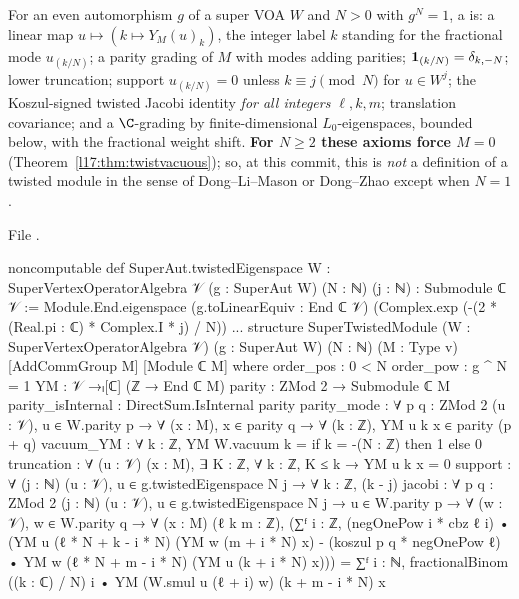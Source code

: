 \begin{definition}\label{l17:def:supertwisted}
For an even automorphism $g$ of a super VOA $W$ and $N>0$ with $g^N=1$, a 
is: a linear map $u\mapsto(k\mapsto Y_M(u)_k)$, the integer label $k$ standing for the fractional
mode $u_{(k/N)}$; a parity grading of $M$ with modes adding parities; $\mathbf{1}_{(k/N)}=\delta_{k,-N}$;
lower truncation; support $u_{(k/N)}=0$ unless $k\equiv j\pmod N$ for $u\in W^j$; the Koszul-signed
twisted Jacobi identity \emph{for all integers $\ell,k,m$}; translation covariance; and a
$\C$-grading by finite-dimensional $L_0$-eigenspaces, bounded below, with the fractional weight shift.
\textbf{For $N\ge2$ these axioms force $M=0$} (Theorem~\ref{l17:thm:twistvacuous}); so, at this
commit, this is \emph{not} a definition of a twisted module in the sense of Dong--Li--Mason or
Dong--Zhao except when $N=1$.
\end{definition}
\noindent File .
\begin{leancode}
noncomputable def SuperAut.twistedEigenspace {W : SuperVertexOperatorAlgebra 𝒱}
    (g : SuperAut W) (N : ℕ) (j : ℕ) : Submodule ℂ 𝒱 :=
  Module.End.eigenspace (g.toLinearEquiv : End ℂ 𝒱)
    (Complex.exp (-(2 * (Real.pi : ℂ) * Complex.I * j) / N))
...
structure SuperTwistedModule (W : SuperVertexOperatorAlgebra 𝒱) (g : SuperAut W)
    (N : ℕ) (M : Type v) [AddCommGroup M] [Module ℂ M] where
  order_pos : 0 < N
  order_pow : g ^ N = 1
  YM : 𝒱 →ₗ[ℂ] (ℤ → End ℂ M)
  parity : ZMod 2 → Submodule ℂ M
  parity_isInternal : DirectSum.IsInternal parity
  parity_mode : ∀ {p q : ZMod 2} (u : 𝒱), u ∈ W.parity p →
    ∀ (x : M), x ∈ parity q → ∀ (k : ℤ), YM u k x ∈ parity (p + q)
  vacuum_YM : ∀ k : ℤ, YM W.vacuum k = if k = -(N : ℤ) then 1 else 0
  truncation : ∀ (u : 𝒱) (x : M), ∃ K : ℤ, ∀ k : ℤ, K ≤ k → YM u k x = 0
  support : ∀ (j : ℕ) (u : 𝒱), u ∈ g.twistedEigenspace N j →
    ∀ k : ℤ, (k - j) %
  jacobi : ∀ {p q : ZMod 2} (j : ℕ) (u : 𝒱),
    u ∈ g.twistedEigenspace N j → u ∈ W.parity p →
    ∀ (w : 𝒱), w ∈ W.parity q → ∀ (x : M) (ℓ k m : ℤ),
    (∑ᶠ i : ℤ, (negOnePow i * cbz ℓ i) •
        (YM u (ℓ * N + k - i * N) (YM w (m + i * N) x)
          - (koszul p q * negOnePow ℓ) •
            YM w (ℓ * N + m - i * N) (YM u (k + i * N) x))) =
      ∑ᶠ i : ℕ, fractionalBinom ((k : ℂ) / N) i •
        YM (W.smul u (ℓ + i) w) (k + m - i * N) x
\end{leancode}
